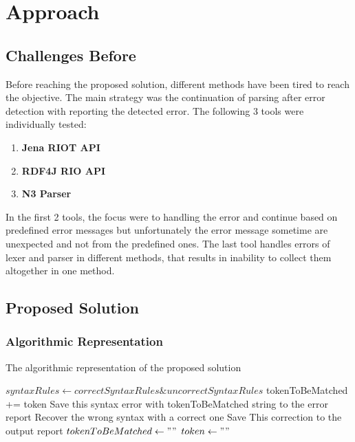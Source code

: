 \chapter{Approach}
\label{ch:approach}

\section{Challenges Before }
Before reaching the proposed solution, different methods have been tired to reach the objective. The main strategy was the continuation of parsing after error detection with reporting the detected error. The following 3 tools were individually tested:
\begin{enumerate}
	
	\item  {\bf Jena RIOT API} %
	\item {\bf RDF4J RIO API} %
	\item {\bf N3 Parser} %
\end{enumerate}
In the first 2 tools, the focus were to handling the error and continue based on predefined error messages but unfortunately the error message sometime are unexpected and not from the predefined ones. The last tool handles errors of lexer and parser in different methods, that results in inability to collect them altogether in one method.    

   
\section{Proposed Solution}


\subsection{Algorithmic Representation }
\begin{algorithm} 
	\caption{The algorithmic representation of the proposed solution} 
	\label{Algorithm} 
	\begin{algorithmic}[1]
		\STATE $syntaxRules \leftarrow correctSyntaxRules \& uncorrectSyntaxRules$  	
		\STATE tokenToBeMatched += token
		\STATE Save this syntax error with tokenToBeMatched string to the error report 
		\STATE  Recover the wrong syntax with a correct one 
		\STATE  Save This correction to the output report
		\ENDIF
		\ENDIF
		\ENDIF
		\STATE $tokenToBeMatched \leftarrow ""$  
		\STATE $token \leftarrow ""$  		
		\ENDIF
		\ENDWHILE
	\end{algorithmic}
\end{algorithm}
 
